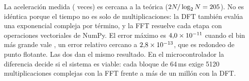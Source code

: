 La aceleración medida (\aRazonMedida{} veces) es cercana a la teórica
($2N/\log_2 N = 205$). No es idéntica porque el tiempo no es solo de
multiplicaciones: la DFT también evalúa una exponencial compleja por término, y
la FFT resuelve cada etapa con operaciones vectoriales de NumPy. El error máximo es $4{,}0\times10^{-11}$ cuando el bin más
grande vale \aBinMaximo, un error relativo cercano a $2{,}8\times10^{-13}$, que es
redondeo de punto flotante. Las dos dan el mismo resultado. En el
microcontrolador la diferencia decide si el sistema es viable: cada bloque de
64\,ms exige 5120 multiplicaciones complejas con la FFT frente a más de un
millón con la DFT.
